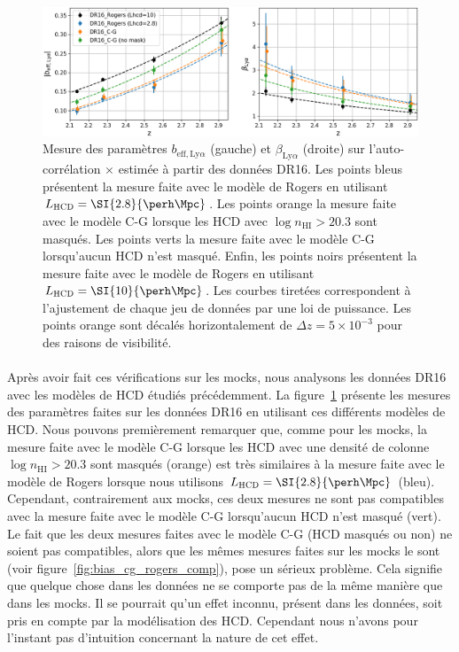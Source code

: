 \begin{figure}
  \centering
  \includegraphics[scale=0.44]{bias_dr16_comp}
  \caption{Mesure des paramètres $b_{\mathrm{eff},\mathrm{Ly}\alpha}$ (gauche) et $\beta_{\mathrm{Ly}\alpha}$ (droite) sur l'auto-corrélation \lya$\times$\lya{} estimée à partir des données DR16. Les points bleus présentent la mesure faite avec le modèle de Rogers en utilisant $L_{\textsc{HCD}} = \SI{2.8}{\perh\Mpc}$. Les points orange la mesure faite avec le modèle C-G lorsque les HCD avec $\log n_{\mathrm{HI}} > \num{20.3}$ sont masqués. Les points verts la mesure faite avec le modèle C-G lorsqu'aucun HCD n'est masqué. Enfin, les points noirs présentent la mesure faite avec le modèle de Rogers en utilisant $L_{\textsc{HCD}} = \SI{10}{\perh\Mpc}$.
      Les courbes tiretées correspondent à l'ajustement de chaque jeu de données par une loi de puissance.
Les points orange sont décalés horizontalement de $\Delta z = 5\times10^{-3}$ pour des raisons de visibilité.}
  \label{fig:bias_dr16_comp}
\end{figure}

\paragraph{}
Après avoir fait ces vérifications sur les mocks, nous analysons les données DR16 avec les modèles de HCD étudiés précédemment. La figure~\ref{fig:bias_dr16_comp} présente les mesures des paramètres \lya{} faites sur les données DR16 en utilisant ces différents modèles de HCD.
Nous pouvons premièrement remarquer que, comme pour les mocks, la mesure faite avec le modèle C-G lorsque les HCD avec une densité de colonne $\log n_{\mathrm{HI}} > \num{20.3}$ sont masqués (orange) est très similaires à la mesure faite avec le modèle de Rogers lorsque nous utilisons $L_{\textsc{HCD}} = \SI{2.8}{\perh\Mpc}$ (bleu). Cependant, contrairement aux mocks, ces deux mesures ne sont pas compatibles avec la mesure faite avec le modèle C-G lorsqu'aucun HCD n'est masqué (vert).
Le fait que les deux mesures faites avec le modèle C-G (HCD masqués ou non) ne soient pas compatibles, alors que les mêmes mesures faites sur les mocks le sont (voir figure~\ref{fig:bias_cg_rogers_comp}), pose un sérieux problème. Cela signifie que quelque chose dans les données ne se comporte pas de la même manière que dans les mocks. Il se pourrait qu'un effet inconnu, présent dans les données, soit pris en compte par la modélisation des HCD. Cependant nous n'avons pour l'instant pas d'intuition concernant la nature de cet effet.


